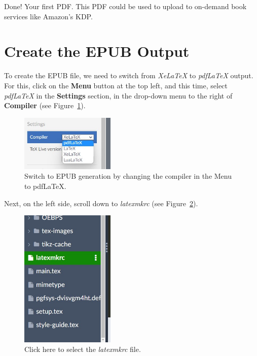 Done! Your first PDF. This PDF could be used to upload to on-demand book services like Amazon's KDP.


\section{Create the EPUB Output}
\label{createhtmlloutput:sec}

To create the EPUB file, we need to switch from \textit{XeLaTeX} to \textit{pdfLaTeX} output. For this, click on the \textbf{Menu} button at the top left, and this time, select \textit{pdfLaTeX} in the \textbf{Settings} section, in the drop-down menu to the right of \textbf{Compiler} (see Figure~\ref{switchpdflatex:fig}).



\begin{figure}[H]\centering
\includegraphics[width=0.4\textwidth]{images/switchpdflatex.jpg}
\caption{Switch to EPUB generation by changing the compiler in the Menu to pdfLaTeX.}
\label{switchpdflatex:fig}
\end{figure}

Next, on the left side, scroll down to \textit{latexmkrc} (see Figure~\ref{latexmkrc:fig}).

\begin{figure}[H]\centering
\includegraphics[width=0.4\textwidth]{images/latexmkrc.jpg}
\caption{Click here to select the \textit{latexmkrc} file.}
\label{latexmkrc:fig}
\end{figure}

